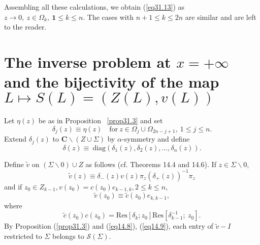 \documentclass{surv-l}
\theoremstyle{plain}
\theoremstyle{definition}
\numberwithin{equation}{chapter}
\begin{document}
Assembling all these calculations, we obtain (\ref{eq31.13}) as $z\rightarrow 0,\ z\in\Omega_{k},\  \mathbf{1}\leq k\leq n$. The cases with $n+1\leq k\leq 2n$ are similar and are left to the reader. \quad {}

\section{The inverse problem at $ x=+\infty$ and the bijectivity of the map $L\mapsto S(L)=(Z(L), v(L))$}\label{sec32} Let $\eta(z)$ be as in Proposition ~\ref{prop31.3} and set
\begin{equation}\label{eq32.1}
\delta_{j}(z)\equiv\eta(z)\quad \mathrm{for}\ z\in\Omega_{j}\cup\Omega_{2n-j+1},\ 1\leq j\leq n.
\end{equation}
Extend $\delta_{j}(z)$ to $\mathbf{C}\backslash (Z\cup\Sigma)$ by $\alpha$-symmetry and define
\begin{equation}\label{eq32.2}
\delta(z)\equiv\ \mathrm{diag} (\delta_{1}(z),\delta_{2}(z),\ldots, \delta_{n}(z)).
\end{equation}

Define $\tilde{v}$ on $(\Sigma\backslash 0)\cup Z$ as follows (cf. Theorems 14.4 and 14.6). If $z\in\Sigma\backslash 0$,
\begin{equation}\label{eq32.3}
\tilde{v}(z)\equiv\delta_{-}(z)v(z)\pi_{z}(\delta_{+}(z))^{-1}\pi_{z}
\end{equation}
and if $z_{0}\in Z_{k-1}, v(z_{0})=c(z_{0})e_{k-1,k}, 2\leq k\leq n$,
\begin{equation}\label{eq32.4}
\tilde{v}(z_{0})\equiv\tilde{c}(z_{0})e_{k,k-1},
\end{equation}
where
\begin{equation}\label{eq32.5}
\tilde{c}(z_{0})c(z_{0})=\mathrm{Res}[\delta_{k};z_{0}]\mathrm{Res}[\delta_{k-1}^{-1}\mathrm{;}\ z_{0}].
\end{equation}
By Proposition (\ref{prop31.3}) and (\ref{eq14.8}), (\ref{eq14.9}), each entry of $\tilde{v}-I$ restricted to $\Sigma$ belongs to $\mathscr{S}(\Sigma)$.
\end{document}
